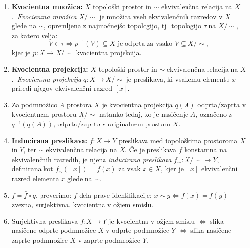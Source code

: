 \documentclass[10pt,a4paper]{article}
\begin{document}
\noindent\makebox[\linewidth]{\rule{\paperwidth}{0.4pt}}
\begin{enumerate}
    
\item \textbf{Kvocientna množica:}  \(X\) topološki prostor in \(\sim\)
    ekvivalenčna relacija na \(X\).~\textit{Kvocientna množica} \(X/{\sim}\) je množica
    vseh ekvivalenčnih razredov v \(X\) glede na \(\sim\), opremljena z najmočnejšo
    topologijo, tj.~topologijo \(\tau\) na \(X/{\sim}\), za katero velja:
    $$ V \in \tau \iff p^{-1}(V) \subseteq X \text{ je odprta za vsako } V
    \subseteq X/{\sim}, $$ kjer je \(p: X \rightarrow X/{\sim}\) kvocientna projekcija.
    
\item \textbf{Kvocientna projekcija:}  \(X\) topološki prostor in \(\sim\)
    ekvivalenčna relacija na \(X\).~\textit{Kvocientna projekcija}
    \(q: X \rightarrow X/{\sim}\) je preslikava, ki vsakemu elementu \(x\) priredi
    njegov ekvivalenčni razred \([x]\).
    
\item Za podmnožico \(A\) prostora \(X\) je kvocientna projekcija \(q(A)\)
    odprta/zaprta v kvocientnem prostoru \(X/{\sim}\) natanko tedaj, ko je nasičenje
    \(A\), označeno z \(q^{-1}(q(A))\), odprto/zaprto v originalnem prostoru \(X\).
    
\item \textbf{Inducirana preslikava:}  \(f: X \rightarrow Y\) preslikava med
    topološkima prostoroma \(X\) in \(Y\), ter \(\sim\) ekvivalenčna relacija na \(X\).
    Če je preslikava $f$ konstantna na ekvivalenčnih razredih, je njena \textit{inducirana preslikava} 
		\(f_{\sim}: X/{\sim} \rightarrow Y\),
    definirana kot \(f_{\sim}([x]) = f(x)\) za vsak \(x \in X\), kjer je \([x]\)
    ekvivalenčni razred elementa \(x\) glede na \(\sim\).
    
\item $f = \bar{f} \circ q $, preverimo: $f$ dela prave identifikacije:
    $x \sim y \Leftrightarrow f(x) = f(y)$, zvezna, surjektivna,
    kvocientna v ožjem smislu.
    
\item Surjektivna preslikava $f: X \rightarrow Y$ je kvocientna v ožjem smislu
    $\Leftrightarrow$ slika nasičene odprte podmnožice $X$ v odprte podmnožice $Y$
    $\Leftrightarrow$ slika nasičene zaprte podmnožice $X$ v zaprte podmnožice $Y$.
    

\end{enumerate}
\end{document}

